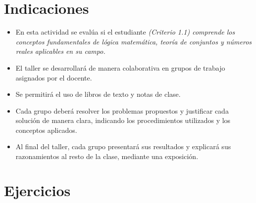 \documentclass[11pt,respuestas,a4]{aleph-examen}
\begin{document}
\encabezado

\section*{Indicaciones}
\begin{itemize}[leftmargin=*]
\item 
    En esta actividad se evalúa si el estudiante \textit{(Criterio 1.1) comprende los conceptos fundamentales de lógica matemática, teoría de conjuntos y números reales aplicables en su campo.}
\item 
    El taller se desarrollará de manera colaborativa en grupos de trabajo asignados por el docente.
\item 
    Se permitirá el uso de libros de texto y notas de clase.
\item 
    Cada grupo deberá resolver los problemas propuestos y justificar cada solución de manera clara, indicando los procedimientos utilizados y los conceptos aplicados.
\item 
    Al final del taller, cada grupo presentará sus resultados y explicará sus razonamientos al resto de la clase, mediante una exposición.
\end{itemize}

\section*{Ejercicios}
\end{document}
